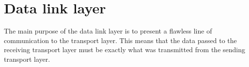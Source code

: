 \chapter{Data link layer}\label{chap:dll}
The main purpose of the data link layer is to present a flawless line of
communication to the transport layer. This means that the data passed to the
receiving transport layer must be exactly what was transmitted from the sending
transport layer. 
